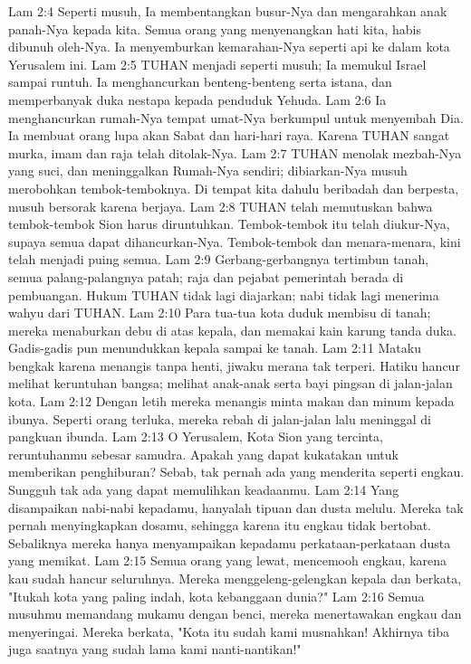 Lam 2:4  Seperti musuh, Ia membentangkan busur-Nya dan mengarahkan anak panah-Nya kepada kita. Semua orang yang menyenangkan hati kita, habis dibunuh oleh-Nya. Ia menyemburkan kemarahan-Nya seperti api ke dalam kota Yerusalem ini.
Lam 2:5  TUHAN menjadi seperti musuh; Ia memukul Israel sampai runtuh. Ia menghancurkan benteng-benteng serta istana, dan memperbanyak duka nestapa kepada penduduk Yehuda.
Lam 2:6  Ia menghancurkan rumah-Nya tempat umat-Nya berkumpul untuk menyembah Dia. Ia membuat orang lupa akan Sabat dan hari-hari raya. Karena TUHAN sangat murka, imam dan raja telah ditolak-Nya.
Lam 2:7  TUHAN menolak mezbah-Nya yang suci, dan meninggalkan Rumah-Nya sendiri; dibiarkan-Nya musuh merobohkan tembok-temboknya. Di tempat kita dahulu beribadah dan berpesta, musuh bersorak karena berjaya.
Lam 2:8  TUHAN telah memutuskan bahwa tembok-tembok Sion harus diruntuhkan. Tembok-tembok itu telah diukur-Nya, supaya semua dapat dihancurkan-Nya. Tembok-tembok dan menara-menara, kini telah menjadi puing semua.
Lam 2:9  Gerbang-gerbangnya tertimbun tanah, semua palang-palangnya patah; raja dan pejabat pemerintah berada di pembuangan. Hukum TUHAN tidak lagi diajarkan; nabi tidak lagi menerima wahyu dari TUHAN.
Lam 2:10  Para tua-tua kota duduk membisu di tanah; mereka menaburkan debu di atas kepala, dan memakai kain karung tanda duka. Gadis-gadis pun menundukkan kepala sampai ke tanah.
Lam 2:11  Mataku bengkak karena menangis tanpa henti, jiwaku merana tak terperi. Hatiku hancur melihat keruntuhan bangsa; melihat anak-anak serta bayi pingsan di jalan-jalan kota.
Lam 2:12  Dengan letih mereka menangis minta makan dan minum kepada ibunya. Seperti orang terluka, mereka rebah di jalan-jalan lalu meninggal di pangkuan ibunda.
Lam 2:13  O Yerusalem, Kota Sion yang tercinta, reruntuhanmu sebesar samudra. Apakah yang dapat kukatakan untuk memberikan penghiburan? Sebab, tak pernah ada yang menderita seperti engkau. Sungguh tak ada yang dapat memulihkan keadaanmu.
Lam 2:14  Yang disampaikan nabi-nabi kepadamu, hanyalah tipuan dan dusta melulu. Mereka tak pernah menyingkapkan dosamu, sehingga karena itu engkau tidak bertobat. Sebaliknya mereka hanya menyampaikan kepadamu perkataan-perkataan dusta yang memikat.
Lam 2:15  Semua orang yang lewat, mencemooh engkau, karena kau sudah hancur seluruhnya. Mereka menggeleng-gelengkan kepala dan berkata, "Itukah kota yang paling indah, kota kebanggaan dunia?"
Lam 2:16  Semua musuhmu memandang mukamu dengan benci, mereka menertawakan engkau dan menyeringai. Mereka berkata, "Kota itu sudah kami musnahkan! Akhirnya tiba juga saatnya yang sudah lama kami nanti-nantikan!"
